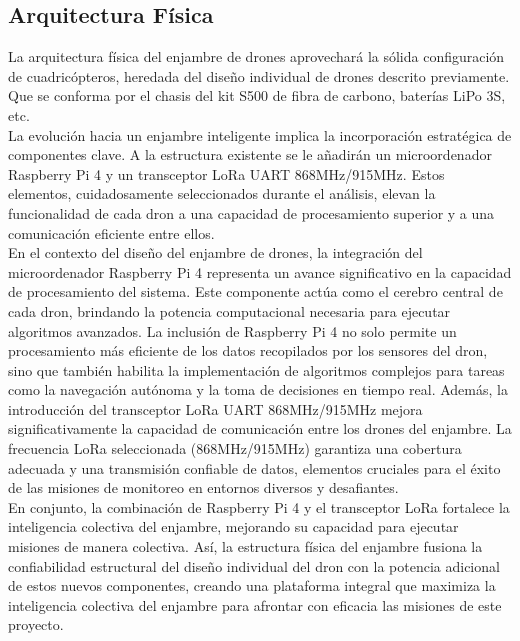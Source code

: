 \subsection{Arquitectura Física}
La arquitectura física del enjambre de drones aprovechará la sólida configuración de cuadricópteros, heredada del diseño individual de drones descrito previamente. Que se conforma por el chasis del kit S500 de fibra de carbono, baterías LiPo 3S, etc.\\
La evolución hacia un enjambre inteligente implica la incorporación estratégica de componentes clave. A la estructura existente se le añadirán un microordenador Raspberry Pi 4 y un transceptor LoRa UART 868MHz/915MHz. Estos elementos, cuidadosamente seleccionados durante el análisis, elevan la funcionalidad de cada dron a una capacidad de procesamiento superior y a una comunicación eficiente entre ellos.\\
En el contexto del diseño del enjambre de drones, la integración del microordenador Raspberry Pi 4 representa un avance significativo en la capacidad de procesamiento del sistema. Este componente actúa como el cerebro central de cada dron, brindando la potencia computacional necesaria para ejecutar algoritmos avanzados. La inclusión de Raspberry Pi 4 no solo permite un procesamiento más eficiente de los datos recopilados por los sensores del dron, sino que también habilita la implementación de algoritmos complejos para tareas como la navegación autónoma y la toma de decisiones en tiempo real. Además, la introducción del transceptor LoRa UART 868MHz/915MHz mejora significativamente la capacidad de comunicación entre los drones del enjambre. La frecuencia LoRa seleccionada (868MHz/915MHz) garantiza una cobertura adecuada y una transmisión confiable de datos, elementos cruciales para el éxito de las misiones de monitoreo en entornos diversos y desafiantes. \\
En conjunto, la combinación de Raspberry Pi 4 y el transceptor LoRa fortalece la inteligencia colectiva del enjambre, mejorando su capacidad para ejecutar misiones de manera colectiva. Así, la estructura física del enjambre fusiona la confiabilidad estructural del diseño individual del dron con la potencia adicional de estos nuevos componentes, creando una plataforma integral que maximiza la inteligencia colectiva del enjambre para afrontar con eficacia las misiones de este proyecto.

